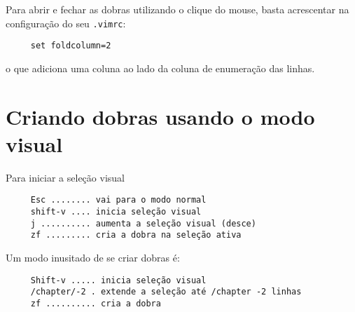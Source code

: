 Para abrir e fechar as dobras utilizando o clique do mouse, basta
acrescentar na configuração do seu \verb|.vimrc|:

\begin{verbatim}
     set foldcolumn=2
\end{verbatim}

o que adiciona uma coluna ao lado da coluna de enumeração das linhas.

\section{Criando dobras usando o modo visual}
\label{Criando folders usando o modo visual}
Para iniciar a seleção visual

\begin{verbatim}
     Esc ........ vai para o modo normal
     shift-v .... inicia seleção visual
     j .......... aumenta a seleção visual (desce)
     zf ......... cria a dobra na seleção ativa
\end{verbatim}

Um modo inusitado de se criar dobras é:

\begin{verbatim}
     Shift-v ..... inicia seleção visual
     /chapter/-2 . extende a seleção até /chapter -2 linhas
     zf .......... cria a dobra
\end{verbatim}
